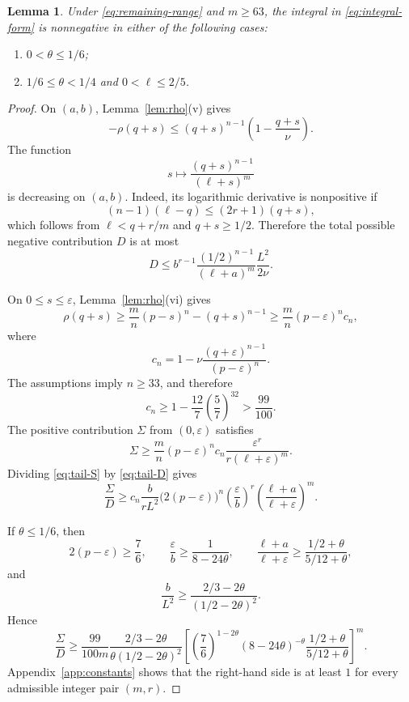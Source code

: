 \documentclass[11pt]{article}
\numberwithin{equation}{section}
\newtheorem{lemma}[theorem]{Lemma}
\newcommand{\eps}{\varepsilon}
\begin{document}
\begin{lemma}\label{lem:left-estimate}
Under \eqref{eq:remaining-range} and $m\ge63$, the integral in \eqref{eq:integral-form} is nonnegative in either of the following cases:
\begin{enumerate}[label=\textup{(\alph*)},leftmargin=2em]
\item $0<\theta\le1/6$;
\item $1/6\le\theta<1/4$ and $0<\ell\le2/5$.
\end{enumerate}
\end{lemma}

\begin{proof}
On $(a,b)$, Lemma~\ref{lem:rho}(v) gives
\[
        -\rho(q+s)\le(q+s)^{n-1}
        \left(1-\frac{q+s}{\nu}\right).
\]
The function
\[
        s\longmapsto\frac{(q+s)^{n-1}}{(\ell+s)^m}
\]
is decreasing on $(a,b)$. Indeed, its logarithmic derivative is nonpositive if
\[
        (n-1)(\ell-q)\le(2r+1)(q+s),
\]
which follows from $\ell<q+r/m$ and $q+s\ge1/2$. Therefore the total possible negative contribution $D$ is at most
\begin{equation}\label{eq:tail-D}
        D\le b^{r-1}\frac{(1/2)^{n-1}}{(\ell+a)^m}
        \frac{L^2}{2\nu}.
\end{equation}

On $0\le s\le\eps$, Lemma~\ref{lem:rho}(vi) gives
\[
 \rho(q+s)
 \ge\frac mn(p-s)^n-(q+s)^{n-1}
 \ge\frac mn(p-\eps)^n c_n,
\]
where
\[
        c_n=1-\nu\frac{(q+\eps)^{n-1}}{(p-\eps)^n}.
\]
The assumptions imply $n\ge33$, and therefore
\[
        c_n\ge1-\frac{12}{7}\left(\frac57\right)^{32}>\frac{99}{100}.
\]
The positive contribution $\Sigma$ from $(0,\eps)$ satisfies
\begin{equation}\label{eq:tail-S}
        \Sigma\ge\frac mn(p-\eps)^n c_n
        \frac{\eps^r}{r(\ell+\eps)^m}.
\end{equation}
Dividing \eqref{eq:tail-S} by \eqref{eq:tail-D} gives
\begin{equation}\label{eq:tail-ratio}
 \frac{\Sigma}{D}
 \ge c_n\frac{b}{rL^2}
 \bigl(2(p-\eps)\bigr)^n
 \left(\frac{\eps}{b}\right)^r
 \left(\frac{\ell+a}{\ell+\eps}\right)^m.
\end{equation}

If $\theta\le1/6$, then
\[
 2(p-\eps)\ge\frac76,
 \qquad
 \frac{\eps}{b}\ge\frac1{8-24\theta},
 \qquad
 \frac{\ell+a}{\ell+\eps}
 \ge\frac{1/2+\theta}{5/12+\theta},
\]
and
\[
        \frac{b}{L^2}
        \ge\frac{2/3-2\theta}{(1/2-2\theta)^2}.
\]
Hence
\begin{equation}\label{eq:tail-A}
 \frac{\Sigma}{D}
 \ge\frac{99}{100m}
 \frac{2/3-2\theta}{\theta(1/2-2\theta)^2}
 \left[
 \left(\frac76\right)^{1-2\theta}
 (8-24\theta)^{-\theta}
 \frac{1/2+\theta}{5/12+\theta}
 \right]^m.
\end{equation}
Appendix~\ref{app:constants} shows that the right-hand side is at least $1$ for every admissible integer pair $(m,r)$.


\end{proof}
\end{document}
